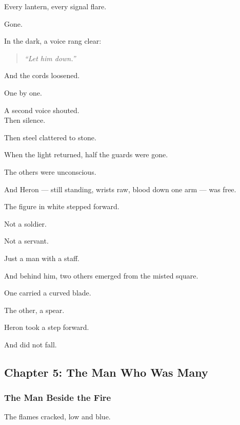 \documentclass[12pt]{article}
\begin{document}
Every lantern, every signal flare.

Gone.

\vspace{1em}

In the dark, a voice rang clear:

\begin{quote}
\textit{“Let him down.”}
\end{quote}

And the cords loosened.

One by one.

A second voice shouted.\\
Then silence.

Then steel clattered to stone.

\vspace{1em}

When the light returned, half the guards were gone.

The others were unconscious.

And Heron — still standing, wrists raw, blood down one arm — was free.

\vspace{1em}

The figure in white stepped forward.

Not a soldier.

Not a servant.

Just a man with a staff.

And behind him, two others emerged from the misted square.

One carried a curved blade.

The other, a spear.

\vspace{1em}

Heron took a step forward.

And did not fall.

\newpage

\subsection*{Chapter 5: The Man Who Was Many}

\vspace{.5in}

\subsubsection*{The Man Beside the Fire}

The flames cracked, low and blue.
\end{document}

